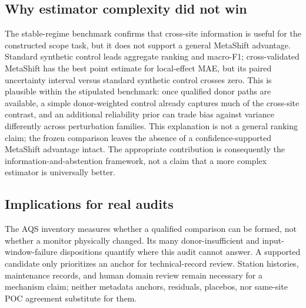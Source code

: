 \subsection{Why estimator complexity did not win}

The stable-regime benchmark confirms that cross-site information is useful for
the constructed scope task, but it does not support a general MetaShift
advantage. Standard synthetic control leads aggregate ranking and macro-F1;
cross-validated MetaShift has the best point estimate for local-effect MAE, but
its paired uncertainty interval versus standard synthetic control crosses zero.
This is plausible within the stipulated benchmark: once qualified donor paths
are available, a simple donor-weighted control already captures much of the
cross-site contrast, and an additional reliability prior can trade bias against
variance differently across perturbation families. This explanation is not a
general ranking claim; the frozen comparison leaves the absence of a
confidence-supported MetaShift advantage intact.
The appropriate contribution is consequently the information-and-abstention
framework, not a claim that a more complex estimator is universally better.

\subsection{Implications for real audits}

The AQS inventory measures whether a qualified comparison can be formed, not
whether a monitor physically changed. Its many donor-insufficient and
input-window-failure dispositions quantify where this audit cannot answer. A
supported candidate only prioritizes an anchor for technical-record review.
Station histories, maintenance records, and human domain review remain
necessary for a mechanism claim; neither metadata anchors, residuals, placebos,
nor same-site POC agreement substitute for them.

